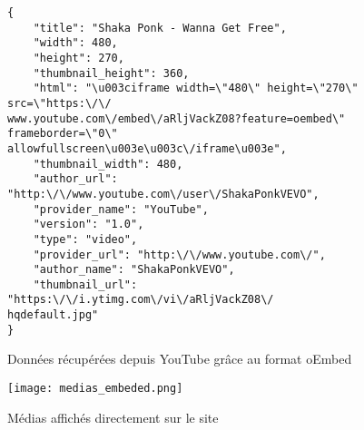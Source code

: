 \begin{figure}[H]
\begin{lstlisting}[frame=single]
{
    "title": "Shaka Ponk - Wanna Get Free", 
    "width": 480, 
    "height": 270, 
    "thumbnail_height": 360, 
    "html": "\u003ciframe width=\"480\" height=\"270\" src=\"https:\/\/
www.youtube.com\/embed\/aRljVackZ08?feature=oembed\" frameborder=\"0\" 
allowfullscreen\u003e\u003c\/iframe\u003e", 
    "thumbnail_width": 480, 
    "author_url": "http:\/\/www.youtube.com\/user\/ShakaPonkVEVO", 
    "provider_name": "YouTube", 
    "version": "1.0", 
    "type": "video", 
    "provider_url": "http:\/\/www.youtube.com\/", 
    "author_name": "ShakaPonkVEVO", 
    "thumbnail_url": "https:\/\/i.ytimg.com\/vi\/aRljVackZ08\/
hqdefault.jpg"
}
\end{lstlisting}
\caption{Données récupérées depuis YouTube grâce au format oEmbed}
\end{figure}

\begin{figure}[H]
\begin{center}
\texttt{[image: medias\_embeded.png]}
\end{center}
\caption{Médias affichés directement sur le site}
\end{figure}
